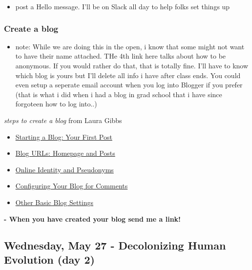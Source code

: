 \documentclass[]{tufte-handout}
\providecommand{\tightlist}{%
  \setlength{\itemsep}{0pt}\setlength{\parskip}{0pt}}
\begin{document}
\begin{itemize}
\tightlist
\item
  post a Hello message. I'll be on Slack all day to help folks set
  things up
\end{itemize}

\hypertarget{create-a-blog}{%
\subsubsection{Create a blog}\label{create-a-blog}}

\begin{itemize}
\tightlist
\item
  note: While we are doing this in the open, i know that some might not
  want to have their name attached. THe 4th link here talks about how to
  be anonymous. If you would rather do that, that is totally fine. I'll
  have to know which blog is yours but I'll delete all info i have after
  class ends. You could even setup a seperate email account when you log
  into Blogger if you prefer (that is what i did when i had a blog in
  grad school that i have since forgoteen how to log into..)
\end{itemize}

\emph{steps to create a blog} from Laura Gibbs

\begin{itemize}
\tightlist
\item
  \href{http://oudigitools.blogspot.com/2020/05/starting-blog-your-first-post.html}{Starting
  a Blog: Your First Post}
\item
  \href{https://oudigitools.blogspot.com/2020/05/blog-urls-homepage-and-posts.html}{Blog
  URLs: Homepage and Posts}
\item
  \href{https://oudigitools.blogspot.com/2020/05/online-identity-and-pseudonyms.html}{Online
  Identity and Pseudonyms}
\item
  \href{https://oudigitools.blogspot.com/2020/05/configuring-your-blog-for-comments.html}{Configuring
  Your Blog for Comments}
\item
  \href{https://oudigitools.blogspot.com/2020/05/other-basic-blog-settings.html}{Other
  Basic Blog Settings}
\end{itemize}

\textbf{- When you have created your blog send me a link!}

\hypertarget{wednesday-may-27---decolonizing-human-evolution-day-2}{%
\subsection{Wednesday, May 27 - Decolonizing Human Evolution (day
2)}\label{wednesday-may-27---decolonizing-human-evolution-day-2}}
\end{document}
